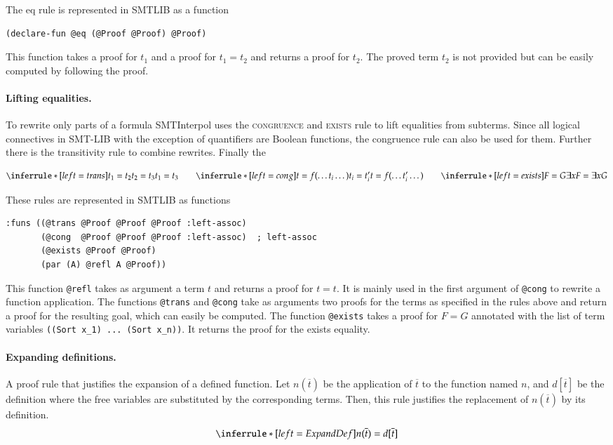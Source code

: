 \documentclass[a4paper]{article}
\newcommand\si{SMTInterpol\xspace}
\begin{document}
The eq rule is represented in SMTLIB as a function
\begin{verbatim}
(declare-fun @eq (@Proof @Proof) @Proof)
\end{verbatim}
This function takes a proof for $t_1$ and a proof for $t_1=t_2$ and
returns a proof for $t_2$.  The proved term $t_2$ is not provided but
can be easily computed by following the proof.

\paragraph{Lifting equalities.}  To rewrite only parts of a formula
\si uses the \textsc{congruence} and \textsc{exists} rule to lift
equalities from subterms.  Since all logical connectives in SMT-LIB
with the exception of quantifiers are Boolean functions, the
congruence rule can also be used for them.  Further there is the
transitivity rule to combine rewrites.  Finally the

\[
\inferrule*[left=trans]{t_1 = t_2 \\ t_2 = t_3}{t_1 = t_3}\qquad
\inferrule*[left=cong]{t = f(\dots t_i \dots) \\ t_i = t'_i}{t = f(\dots t'_i \dots)}\qquad
\inferrule*[left=exists]{F = G}{\exists x F = \exists x G}
\]

These rules are represented in SMTLIB as functions
\begin{verbatim}
:funs ((@trans @Proof @Proof @Proof :left-assoc)
       (@cong  @Proof @Proof @Proof :left-assoc)  ; left-assoc
       (@exists @Proof @Proof)
       (par (A) @refl A @Proof))
\end{verbatim}

This function \verb+@refl+ takes as argument a term $t$ and returns a
proof for $t=t$.  It is mainly used in the first argument of
\verb+@cong+ to rewrite a function application.  The functions
\verb+@trans+ and \verb+@cong+ take as arguments two proofs for the
terms as specified in the rules above and return a proof for the
resulting goal, which can easily be computed.  The function
\verb+@exists+ takes a proof for $F=G$ annotated with the list of term
variables \verb+((Sort x_1) ... (Sort x_n))+.  It returns the proof
for the exists equality.

\paragraph{Expanding definitions.}  A proof rule that justifies the expansion
of a defined function.  Let $n(\overline{t})$ be the application of
$\overline{t}$ to the function named $n$, and $d[\overline{t}]$ be the
definition where the free variables are substituted by the corresponding
terms.  Then, this rule justifies the replacement of $n(\overline{t})$ by its
definition.
\[
\inferrule*[left=ExpandDef]{ }{n(\overline{t}) = d[\overline{t}]}
\]
\end{document}
